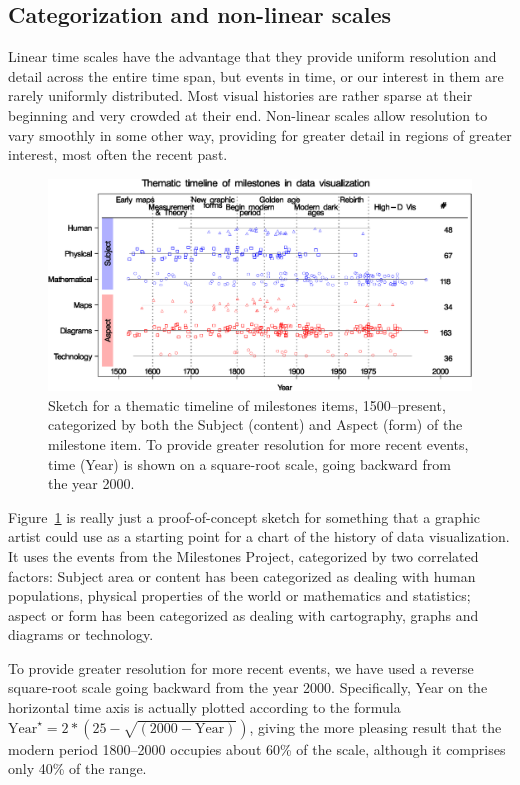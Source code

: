 \documentclass[11pt]{article}
\newcommand*{\figref}[1]{Figure~\ref{#1}}
\begin{document}
\subsection{Categorization and non-linear scales}

Linear time scales have the advantage that they
provide uniform resolution and detail across the entire time span, but events in time, or our interest in them are rarely uniformly distributed. Most visual histories are rather sparse at their beginning and very
crowded at their end.
Non-linear scales allow resolution to vary smoothly in some other way, providing for greater detail
in regions of greater interest, most often the recent past.


\begin{figure}[!htb]
  \centering
  \includegraphics[width=\textwidth,clip]{fig/milecatline}
  \caption{Sketch for a thematic timeline of milestones items, 1500--present,
  categorized by both the Subject (content)
  and Aspect (form) of the milestone item.  To provide greater resolution for more recent events,
  time (Year) is shown on a square-root scale, going backward from the year 2000.
  }
  \label{fig:milecatline}
\end{figure}

\figref{fig:milecatline} is really just a proof-of-concept sketch for something that a graphic artist
could use as a starting point for a chart of
the history of data visualization. It uses the events from the
Milestones Project, categorized by two correlated factors: 
Subject area or content has been
categorized as dealing with human populations, physical properties of the world or
mathematics and statistics; aspect or form has been categorized as dealing with
cartography, graphs and diagrams or technology. 

To provide greater resolution for more recent events, we have used a reverse square-root
scale going backward from the year 2000. Specifically, Year on the horizontal time axis
is actually plotted according to the formula $\textrm{Year}^\star = 2* (25 - \sqrt{(2000 - \textrm{Year})})$,
giving the more pleasing result that the modern period 1800--2000 occupies about 60\% of the scale,
although it comprises only 40\% of the range.
\end{document}
